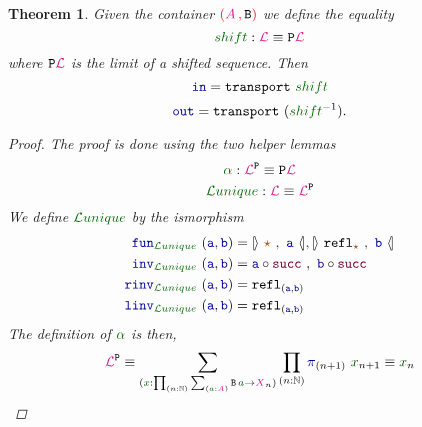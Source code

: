 \documentclass[twoside,11pt,openright]{report}
\theoremstyle{plain} %
\newtheorem{thm}{Theorem}[section]
\theoremstyle{definition}
\theoremstyle{remark}
\newcommand*{\term}[1]{\textcolor{green!30!black}{#1}} %
\newcommand*{\pathterm}[1]{\textcolor{green!40!black}{#1}}
\newcommand*{\type}[1]{\textcolor{magenta!90!black}{#1}}
\newcommand*{\containerpair}[2]{\textcolor{red}{(}#1\,\textcolor{red}{,}\,#2\textcolor{red}{)}}
\newcommand*{\constant}[1]{\textcolor{orange!60!black}{\ensuremath{\mathtt{#1}}}}
\newcommand*{\function}[1]{\textcolor{blue!60!black}{\ensuremath{\mathtt{#1}}}}
\newcommand*{\constructor}[1]{\textcolor{purple!60!black}{\ensuremath{\mathtt{#1}}}}
\newcommand*{\typeformer}[1]{\ensuremath{\mathtt{#1}}}
\newcommand*{\functor}[1]{\ensuremath{\mathbf{\mathtt{#1}}}}
\newcommand*{\unitelem}{\constant{\star}} %
\newcommand*{\natcases}[2]{\ensuremath{\mathbb{[\hspace{-.5mm}\rangle}~\ensuremath{#1}~,~\ensuremath{#2}~\mathbb{\langle\hspace{-.5mm}]}}}
\newcommand*{\sym}[1]{\ensuremath{#1^{-1}}}
\begin{document}
\begin{thm}
   Given the container \(\containerpair{\type{A}}{\typeformer{B}}\) we define the equality
  \begin{equation}
    \pathterm{shift} : \type{\mathcal{L}} \equiv \functor{P}\type{\mathcal{L}}
  \end{equation}
  where \(\functor{P}\type{\mathcal{L}}\) is the limit of a shifted sequence. Then
  \begin{equation}
    \function{in} = \mathtt{transport}~\pathterm{shift}
  \end{equation}
  \begin{equation}
    \function{out} = \mathtt{transport}~(\sym{\pathterm{shift}}).
  \end{equation}
  \begin{proof}
    The proof is done using the two helper lemmas
    \begin{equation}
      \pathterm{\alpha} : \type{\mathcal{L}}^{\functor{P}} \equiv \functor{P}\type{\mathcal{L}}
    \end{equation}
    \begin{equation}
      \pathterm{\mathcal{L}unique} : \type{\mathcal{L}} \equiv \type{\mathcal{L}}^{\functor{P}}
    \end{equation}
    We define \(\pathterm{\mathcal{L}unique}\) by the ismorphism
    \begin{align}
      \function{fun}_{\pathterm{\mathcal{L}unique}}~(\function{a} , \function{b}) &= \natcases{\unitelem}{\function{a}} , \natcases{\mathtt{refl}_{\unitelem}}{\function{b}} \\
    \function{inv}_{\pathterm{\mathcal{L}unique}}~(\function{a} , \function{b}) &= \function{a} \circ \constructor{succ}~,~\function{b} \circ \constructor{succ} \\
    \function{rinv}_{\pathterm{\mathcal{L}unique}}~(\function{a} , \function{b}) &= \mathtt{refl}_{(\function{a},\function{b})} \\
    \function{linv}_{\pathterm{\mathcal{L}unique}}~(\function{a} , \function{b}) &= \mathtt{refl}_{(\function{a},\function{b})}
    \end{align}
    The definition of \(\pathterm{\alpha}\) is then, 
    \begin{align}
      \type{\mathcal{L}}^{\functor{P}} &\equiv \sum_{(\term{x} : \prod_{(n : \mathbb{N})} \sum_{(\term{a} : \type{A})} \typeformer{B}\,\term{a} \rightarrow \type{X}_n)} \prod_{(n : \mathbb{N})} \function{\pi}_{(n+1)}~\term{x}_{n+1} \equiv \term{x}_{n} \\

\end{align}
\end{proof}
\end{thm}
\end{document}
